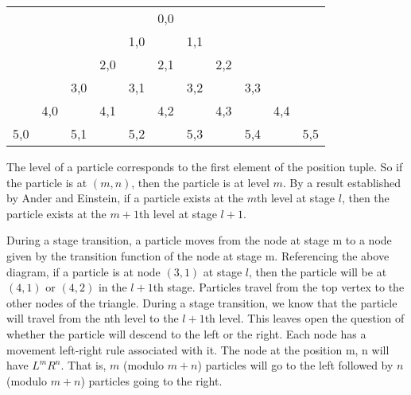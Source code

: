 \documentclass[11pt]{article}
\begin{document}
\begin{center}
\begin{tabular}{ l c c c c c c c c c r }
  \  & \  & \  & \  & \  & 0,0 & \  & \  & \  & \  & \  \\
  \  & \  & \  & \  & 1,0 & \  & 1,1 & \  & \  & \  & \  \\
  \  & \  & \  & 2,0 & \  & 2,1 & \  & 2,2 & \  & \  \\
  \  & \  & 3,0 & \  & 3,1 & \  & 3,2 & \  & 3,3 & \  & \  \\
  \  & 4,0 & \  & 4,1 & \  & 4,2 & \  & 4,3 & \  & 4,4 & \  \\
  5,0 & \  & 5,1 & \  & 5,2 & \  & 5,3 & \  & 5,4 & \  & 5,5 \\
\end{tabular}
\end{center}

The level of a particle corresponds to the first element of the position tuple. So if the particle is at $(m,n)$, then the particle is at level $m$. By a result established by Ander and Einstein, if a particle exists at the $m$th level at stage $l$, then the particle exists at the $m+1$th level at stage $l+1$. 

During a stage transition, a particle moves from the node at stage m to a node given by the transition function of the node at stage m.
Referencing the above diagram, if a particle is at node $(3,1)$ at stage $l$, then the particle will be at $(4,1)$ or $(4,2)$ in the $l+1$th stage.
Particles travel from the top vertex to the other nodes of the triangle. During a stage transition, we know that the particle will travel from the nth level to the $l+1$th level. This leaves open the question of whether the particle will descend to the left or the right. Each node has a movement left-right rule associated with it. The node at the position m, n will have $L^mR^n$. That is, $m$ (modulo  $m+n$) particles will go to the left followed by $n$ (modulo  $m+n$) particles going to the right. 
\end{document}
